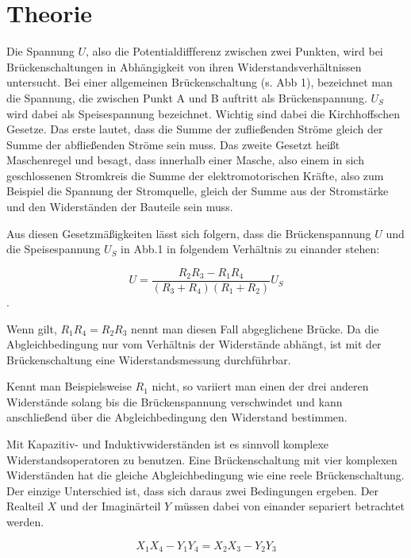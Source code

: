 \section{Theorie}
\label{sec:Theorie}

Die Spannung $U$, also die Potentialdiffferenz zwischen zwei Punkten, wird bei Brückenschaltungen in Abhängigkeit von ihren Widerstandsverhältnissen untersucht.
Bei einer allgemeinen Brückenschaltung (s. Abb 1), bezeichnet man die Spannung, die zwischen Punkt A und B auftritt als Brückenspannung. $U_S$ wird dabei als Speisespannung bezeichnet. 
Wichtig sind dabei die Kirchhoffschen Gesetze. Das erste lautet, dass die Summe der zufließenden Ströme gleich der Summe der abfließenden Ströme sein muss. 
Das zweite Gesetzt heißt Maschenregel und besagt, dass innerhalb einer Masche, also einem in sich geschlossenen Stromkreis die Summe der elektromotorischen Kräfte, also zum Beispiel die Spannung der Stromquelle, gleich der Summe aus der Stromstärke und den Widerständen der Bauteile sein muss. 

Aus diesen Gesetzmäßigkeiten lässt sich folgern, dass die Brückenspannung $U$ und die Speisespannung $U_S$ in Abb.1 in folgendem Verhältnis zu einander stehen:

\begin{equation}
    U = \frac{R_2R_3 - R_1R_4}{(R_3 + R_4)(R_1 + R_2)}U_S 
\end{equation}.

Wenn gilt, $R_1R_4 = R_2R_3$ nennt man diesen Fall abgeglichene Brücke. Da die Abgleichbedingung nur vom Verhältnis der Widerstände abhängt, ist mit der Brückenschaltung eine Widerstandsmessung durchführbar. 

Kennt man Beispielsweise $R_1$ nicht, so variiert man einen der drei anderen Widerstände solang bis die Brückenspannung verschwindet und kann anschließend über die Abgleichbedingung den Widerstand bestimmen. 

Mit Kapazitiv- und Induktivwiderständen ist es sinnvoll komplexe Widerstandsoperatoren zu benutzen. 
Eine Brückenschaltung mit vier komplexen Widerständen hat die gleiche Abgleichbedingung wie eine reele Brückenschaltung. Der einzige Unterschied ist, dass sich daraus zwei Bedingungen ergeben. Der Realteil $X$ und der Imaginärteil $Y$ müssen dabei von einander separiert betrachtet werden. 

\begin{equation}
    X_1X_4 - Y_1Y_4 = X_2X_3 - Y_2Y_3 
\end{equation}

